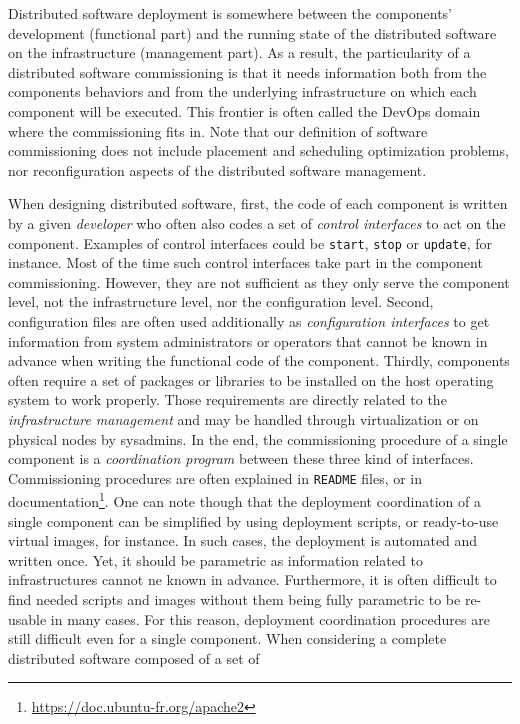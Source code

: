 Distributed software deployment is somewhere between the components' development (functional part) and the running state of the distributed software on the infrastructure (management part). As a result, the particularity of a distributed software commissioning is that it needs information both from the components behaviors and from the underlying infrastructure on which each component will be executed. This frontier is often called the DevOps domain where the commissioning fits in. Note that our definition of software commissioning does not include placement and scheduling optimization problems, nor reconfiguration aspects of the distributed software management.

When designing distributed software, first, the code of each component is written by a given \emph{developer} who often also codes a set of \emph{control 	interfaces} to act on the component. Examples of control interfaces could be \texttt{start}, \texttt{stop} or \texttt{update}, for instance. Most of the time such control interfaces take part in the component commissioning. However, they are not sufficient as they only serve the component level, not the infrastructure level, nor the configuration level. Second, configuration files are often used additionally as \emph{configuration interfaces} to get information from system administrators or operators that cannot be known in advance when writing the functional code of the component. Thirdly, components often require a set of packages or libraries to be installed on the host operating system to work properly. Those requirements are directly related to the \emph{infrastructure management} and may be handled through virtualization or on physical nodes by sysadmins.
%
In the end, the commissioning procedure of a single component is a \emph{coordination program} between these three kind of interfaces. Commissioning
procedures are often explained in \texttt{README} files, or in documentation\footnote{\url{https://doc.ubuntu-fr.org/apache2}}. One can note though that the deployment coordination of a single component can be simplified by using deployment scripts, or ready-to-use virtual images, for instance. In such cases, the deployment is automated and written once. Yet, it should be parametric as information related to infrastructures cannot ne known in advance. Furthermore, it is often difficult to find needed scripts and images without them being fully parametric to be re-usable in many cases. For this reason, deployment coordination procedures are still difficult even for a single component.
%
When considering a complete distributed software composed of a set of
